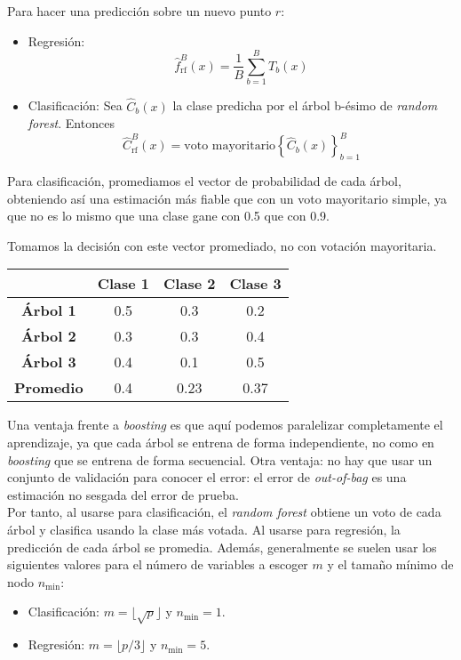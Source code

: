 \noindent Para hacer una predicción sobre un nuevo punto $r$: 
\begin{itemize}
\item Regresión:
\begin{equation}
\hat{f}_{\text{rf}}^B(x) = \frac{1}{B} \sum_{b=1}^{B} T_b(x)
\end{equation}
\item Clasificación: Sea $\hat{C}_b (x)$ la clase predicha por el árbol b-ésimo de \textit{random forest}. Entonces
\begin{equation}
\hat{C}_{\text{rf}}^B(x) = \text{voto mayoritario} \left\{ \hat{C}_b(x) \right\}_{b = 1}^B
\end{equation}
\end{itemize}

Para clasificación, promediamos el vector de probabilidad de cada árbol, obteniendo así una estimación más fiable que con un voto mayoritario simple, ya que no es lo mismo que una clase gane con 0.5 que con 0.9. 
\begin{example}
Tomamos la decisión con este vector promediado, no con votación mayoritaria.
\begin{table}[H]
\centering
\begin{tabular}{cccc}
\toprule
 & \textbf{Clase 1} & \textbf{Clase 2} & \textbf{Clase 3} \\
\midrule
\textbf{Árbol 1} & 0.5 & 0.3 & 0.2 \\
\textbf{Árbol 2} & 0.3 & 0.3 & 0.4 \\
\textbf{Árbol 3} & 0.4 & 0.1 & 0.5 \\
\midrule
\textbf{Promedio} & 0.4 & 0.23 & 0.37 \\
\bottomrule
\end{tabular}
\end{table} 
\end{example}

Una ventaja frente a \textit{boosting} es que aquí podemos paralelizar completamente el aprendizaje, ya que cada árbol se entrena de forma independiente, no como en \textit{boosting} que se entrena de forma secuencial. Otra ventaja: no hay que usar un conjunto de validación para conocer el error: el error de \textit{out-of-bag} es una estimación no sesgada del error de prueba. \\

Por tanto, al usarse para clasificación, el \textit{random forest} obtiene un voto de cada árbol y clasifica usando la clase más votada. Al usarse para regresión, la predicción de cada árbol se promedia. Además, generalmente se suelen usar los siguientes valores para el número de variables a escoger $m$ y el tamaño mínimo de nodo $n_{\text{min}}$:
\begin{itemize}
\item Clasificación: $m = \lfloor\sqrt{p}\rfloor$ y $n_{\text{min}} = 1$.
\item Regresión: $m = \lfloor p/3\rfloor$ y $n_{\text{min}} = 5$.
\end{itemize}

